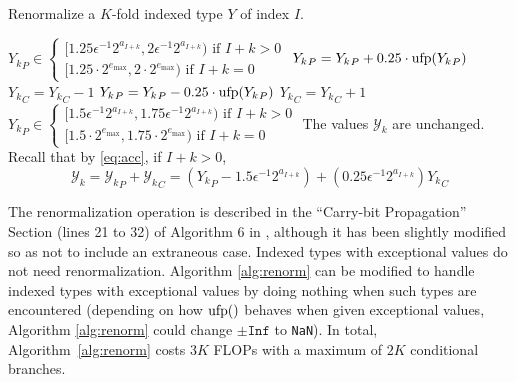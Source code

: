     \begin{samepage}
    \begin{alg}
      Renormalize a $K$-fold indexed type $Y$ of index $I$.
      \begin{algorithmic}[1]
        \Require
        \Statex ${Y_k}_P \in \begin{cases}[1.25  \epsilon^{-1} 2^{a_{I + k}}, 2  \epsilon^{-1} 2^{a_{I + k}}) \text{ if } I + k > 0 \\ [1.25 \cdot 2^{e_{\max}}, 2 \cdot 2^{e_{\max}}) \text{ if } I + k = 0\end{cases} $
              \State ${Y_k}_P = {Y_k}_P + 0.25 \cdot \text{ufp}({Y_k}_P)$
              \State ${Y_k}_C = {Y_k}_C - 1$
            \EndIf
              \State ${Y_k}_P = {Y_k}_P - 0.25 \cdot \text{ufp}({Y_k}_P)$
              \State ${Y_k}_C = {Y_k}_C + 1$
            \EndIf
          \EndFor
        \EndFunction
        \Ensure
          \Statex ${Y_k}_P \in \begin{cases}[1.5  \epsilon^{-1} 2^{a_{I + k}}, 1.75  \epsilon^{-1} 2^{a_{I + k}}) \text{ if } I + k > 0 \\ [1.5 \cdot 2^{e_{\max}}, 1.75 \cdot 2^{e_{\max}}) \text{ if } I + k = 0\end{cases} $
          \Statex The values $\mathcal{Y}_k$ are unchanged. Recall that by \eqref{eq:acc}, if $I + k > 0$,
          \begin{equation*}
            \mathcal{Y}_k = {\mathcal{Y}_k}_P + {\mathcal{Y}_k}_C = ({Y_k}_P - 1.5 \epsilon^{-1} 2^{a_{I + k}}) + (0.25\epsilon^{-1}2^{a_{I + k}}){Y_k}_C
          \end{equation*}
      \end{algorithmic}
      \label{alg:renorm}
    \end{alg}
    \end{samepage}
    The renormalization operation is described in the ``Carry-bit Propagation''
    Section (lines 21 to 32) of Algorithm $6$ in \cite{repsum}, although it has
    been slightly modified so as not to include an extraneous case. Indexed 
    types with exceptional values do not need renormalization. 
    Algorithm \ref{alg:renorm} can be modified to handle indexed 
    types with exceptional values by doing nothing when such types are
    encountered (depending on how $\text{ufp}()$ behaves when given exceptional values, Algorithm \ref{alg:renorm} could change $\pm\texttt{Inf}$ to \texttt{NaN}).
    In total, Algorithm~\ref{alg:renorm} costs $3K$ FLOPs with a maximum of
    $2K$ conditional branches.

